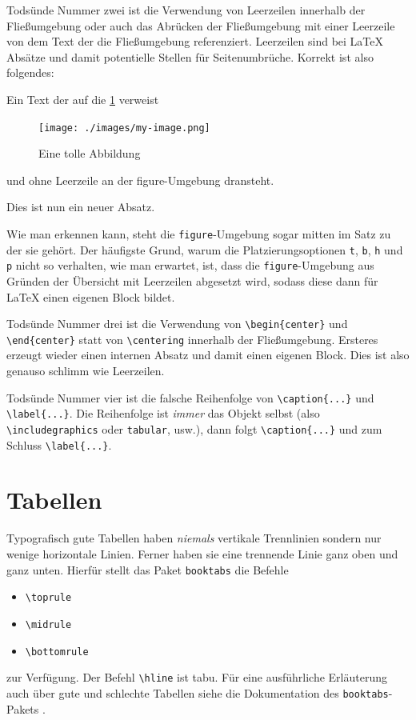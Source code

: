 Todsünde Nummer zwei ist die Verwendung von Leerzeilen innerhalb der
Fließumgebung oder auch das Abrücken der Fließumgebung mit einer Leerzeile von
dem Text der die Fließumgebung referenziert. Leerzeilen sind bei LaTeX Absätze
und damit potentielle Stellen für Seitenumbrüche. Korrekt ist also folgendes:
\begin{latex}[caption={Verbot von Leerzeilen},label={lst:prohibited-blank-lines}]
Ein Text der auf die \cref{fig:my-fig} verweist
\begin{figure}[htbp]
  \centering
  \texttt{[image: ./images/my-image.png]}
  \caption{Eine tolle Abbildung}
  \label{fig:my-fig}
\end{figure}
und ohne Leerzeile an der figure-Umgebung dransteht.

Dies ist nun ein neuer Absatz.
\end{latex}
Wie man erkennen kann, steht die \texttt{figure}-Umgebung sogar mitten im Satz
zu der sie gehört. Der häufigste Grund, warum die Platzierungsoptionen
\texttt{t}, \texttt{b}, \texttt{h} und  \texttt{p} nicht so verhalten, wie
man erwartet, ist, dass die \texttt{figure}-Umgebung aus Gründen der Übersicht
mit Leerzeilen abgesetzt wird, sodass diese dann für LaTeX einen eigenen Block
bildet.

Todsünde Nummer drei ist die Verwendung von \verb#\begin{center}# und
\verb#\end{center}# statt von \verb#\centering# innerhalb der Fließumgebung.
Ersteres erzeugt wieder einen internen Absatz und damit einen eigenen Block.
Dies ist also genauso schlimm wie Leerzeilen.

Todsünde Nummer vier ist die falsche Reihenfolge von \verb#\caption{...}# und
\verb#\label{...}#. Die Reihenfolge ist \emph{immer} das Objekt selbst (also
\verb#\includegraphics# oder \verb#tabular#, usw.), dann folgt \verb#\caption{...}#
und zum Schluss \verb#\label{...}#.

\section{Tabellen}

Typografisch gute Tabellen haben \emph{niemals} vertikale Trennlinien sondern
nur wenige horizontale Linien. Ferner haben sie eine trennende Linie ganz oben
und ganz unten. Hierfür stellt das Paket \texttt{booktabs} die Befehle
\begin{itemize}
  \item \verb#\toprule#
	\item \verb#\midrule#
	\item \verb#\bottomrule#
\end{itemize}
zur Verfügung. Der Befehl \verb#\hline# ist tabu. Für eine ausführliche
Erläuterung auch über gute und schlechte Tabellen siehe die Dokumentation des
\texttt{booktabs}-Pakets \parencite{Fear2005}.

